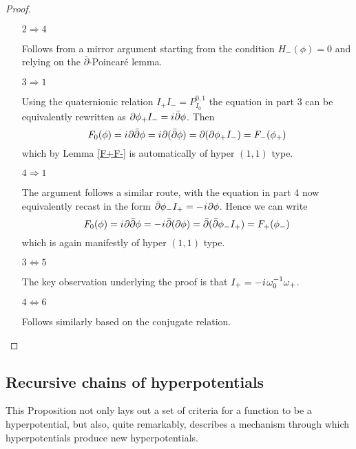 \documentclass[11pt]{amsart}
\theoremstyle{remark}
\theoremstyle{remark}
\theoremstyle{definition}
\theoremstyle{definition}
\theoremstyle{definition}
\newcommand{\Io}{{\scriptscriptstyle I_0}}
\newcommand{\0}{{\scriptstyle 0'}} %
\newcommand{\1}{{\scriptstyle 1'}}
\newcommand{\pt}{\hspace{1pt}} %
\newcommand{\hp}{\hspace{0.5pt}} %
\begin{document}
\begin{proof}
\begin{itemize}[leftmargin=\leftmargin-3.5pt]
\item[$2 \Rightarrow 4$]

Follows from a mirror argument starting from the condition $H_-(\phi) = 0$ and relying on the \mbox{$\bar{\partial}$\pt-\hp Poincar\'e} lemma. 

\item[$3 \Rightarrow 1$]

Using the quaternionic relation $I_+I_- = P^{0,1}_{\Io}$ the equation in part 3 can be equivalently rewritten as $\partial\phi_+I_- = i \hp \bar{\partial}\phi$. Then 
\begin{equation}
F_0(\phi) = i\hp \partial\bar{\partial}\phi =  i\hp \partial(\bar{\partial}\phi)  =  \partial(\partial\phi_+I_-) = F_-(\phi_+)
\end{equation}
which by Lemma \ref{F+F-} is automatically of hyper $(1,1)$ type.

\item[$4 \Rightarrow 1$]

The argument follows a similar route, with the equation in part 4 now equivalently recast in the form $\bar{\partial} \phi_-I_+ = - \hp i \hp \partial\phi$. Hence we can write
\begin{equation}
F_0(\phi) = i \hp \partial\bar{\partial}\phi = - \hp i \hp \bar{\partial}(\partial\phi) = \bar{\partial}(\bar{\partial}\phi_-I_+) = F_+(\phi_-)
\end{equation}
which is again manifestly of hyper $(1,1)$ type. 

\item[$3 \Leftrightarrow 5$]

The key observation underlying the proof is that $I_+ = - \hp i \pt \omega_0^{-1}\omega_+$.

\item[$4 \Leftrightarrow 6$]

Follows similarly based on the conjugate relation. \hfill \ \qedhere  
\end{itemize}
\end{proof}


\subsection{Recursive chains of hyperpotentials} \label{ssec:rec_chains} \hfill \medskip


This Proposition not only lays out a set of criteria for a function to be a hyperpotential, but also, quite remarkably, describes a mechanism through which hyperpotentials produce new hyperpotentials.
\end{document}
